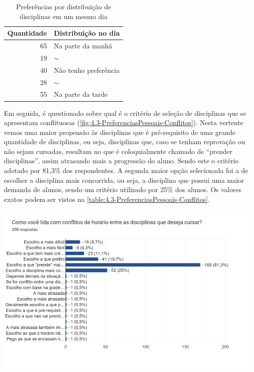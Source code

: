 \begin{table}[htbp]\centering
  \caption{Preferências por distribuição de disciplinas em um mesmo dia}
  \label{table:4.2-PreferenciasPessoais-Manha_Tarde}
  \begin{tabular}{| r l |}
    \hline
    \textbf{Quantidade} & \textbf{Distribuição no dia} \\
    \hline
    65                  & Na parte da manhã            \\
    19                  & $\sim$                       \\
    40                  & Não tenho preferência        \\
    28                  & $\sim$                       \\
    55                  & Na parte da tarde            \\
    \hline
  \end{tabular}
\end{table}

Em seguida, é questionado sobre qual é o critério de seleção de disciplinas que se apresentam conflituosas (\autoref{fig:4.3-PreferenciasPessoais-Conflitos}). Nesta vertente vemos uma maior propensão às disciplinas que é pré-requisito de uma grande quantidade de disciplinas, ou seja, disciplinas que, caso se tenham reprovação ou não sejam cursadas, resultam no que é coloquialmente chamado de ``prender disciplinas'', assim atrasando mais a progressão do aluno. Sendo este o critério adotado por 81,3\% dos respondentes. A segunda maior opção selecionada foi a de escolher a disciplina mais concorrida, ou seja, a disciplina que possui uma maior demanda de alunos, sendo um critério utilizado por 25\% dos alunos. Os valores exatos podem ser vistos na \autoref{table:4.3-PreferenciasPessoais-Conflitos}.

\begin{MyCenteredFigure}
  \caption{Critérios para a escolha de disciplinas conflituosas}
  \label{fig:4.3-PreferenciasPessoais-Conflitos}
  \includegraphics[width=\textwidth]{files/img/Forms/4.3-PreferenciasPessoais-Conflitos}
\end{MyCenteredFigure} %


